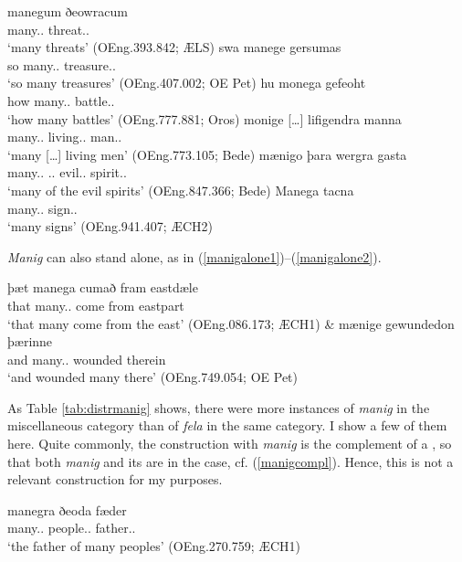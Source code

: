 \documentclass[output=paper,colorlinks,citecolor=brown]{langscibook}
\begin{document}
\ea\label{manigagr1}
\gll manegum ðeowracum\\
	many.\DAT.\PL{} threat.\DAT.\PL\\
\glt ‘many threats’ (OEng.393.842; ÆLS)
\ex\label{manigagr2}
\gll swa manege gersumas\\
	so many.\ACC.\PL{} treasure.\ACC.\PL\\
\glt ‘so many treasures’ (OEng.407.002; OE Pet)
\ex\label{manigagr3}
\gll hu monega gefeoht\\
	how many.\ACC.\PL{} battle.\ACC.\PL\\
\glt ‘how many battles’ (OEng.777.881; Oros)
\ex\label{manigpart1}
\gll monige […] lifigendra manna\\
	many.\NOM.\PL{} {} living.\GEN.\PL{} man.\GEN.\PL\\
\glt ‘many […] living men’ (OEng.773.105; Bede)
\ex\label{manigpart2}
\gll mænigo þara wergra gasta\\
	many.\ACC.\PL{} \DEF.\GEN.\PL{} evil.\GEN.\PL{} spirit.\GEN.\PL\\
\glt ‘many of the evil spirits’ (OEng.847.366; Bede)
\ex\label{manigpart3}
\gll Manega tacna\\
	many.\NOM.\PL{} sign.\GEN.\PL\\
\glt ‘many signs’ (OEng.941.407; ÆCH2)
\z

\textit{Manig} can also stand alone, as in (\ref{manigalone1})--(\ref{manigalone2}).

\ea\label{manigalone1}
\gll þæt manega cumað fram eastdæle\\
	that many.\NOM.\PL{} come from eastpart\\
\glt ‘that many come from the east’ (OEng.086.173; ÆCH1)
\ex\label{manigalone2}
\gll \& mænige gewundedon þærinne\\
	and many.\ACC.\PL{} wounded therein\\
\glt ‘and wounded many there’ (OEng.749.054; OE Pet)
\z

As Table \ref{tab:distrmanig} shows, there were more instances of \textit{manig} in the miscellaneous category than of \textit{fela} in the same category. I show a few of them here. Quite commonly, the construction with \textit{manig} is the complement of a , so that both \textit{manig} and its  are in the  case, cf. (\ref{manigcompl}). Hence, this is not a relevant construction for my purposes.

\ea\label{manigcompl}
\gll manegra ðeoda fæder\\
	many.\GEN.\PL{} people.\GEN.\PL{} father.\NOM.\SG\\
\glt ‘the father of many peoples’ (OEng.270.759; ÆCH1)
\z
\end{document}
